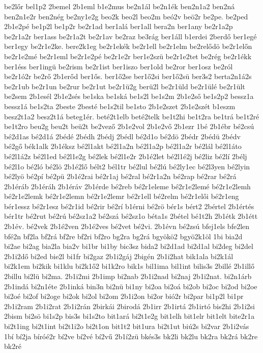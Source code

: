 {be2lőr
bel1p2
2bemel
2b1eml
b1e2mus
be2n1ál
be2n1ék
ben2n1a2
ben2ná
ben2n1e2r
ben2nég
be2ny1e2g
beo2k
beo2l
beo2m
beó2v
beö2r
be2pe.
be2ped
2b1e2pé
be1p2l
be1p2r
be2r1ad
ber1alá
ber1all
bera2n
ber1any
be2r1a2p
be2r1a2r
ber1ass
be2r1a2t
be2r1av
be2raz
be3rág
ber1áll
b1erdei
2berdő
ber1egé
ber1egy
be2r1e2ke.
bere2k1eg
be2r1ekék
be2r1ell
be2r1elm
be2relődö
be2r1előn
be2r1e2mé
be2r1eml
be2r1e2pé
be2r1e2r
ber1e2szü
be2r1e2tet
be2rég
be2r1ékk
ber1éss
ber1ingü
be2rism
be2r1ist
ber1iszo
ber1old
be2ror
ber1osz
be2ról
be2r1ó2r
be2rő
2b1erőd
ber1ős.
ber1ő2se
ber1ő2si
ber1ő2sü
ber3s2
berta2n1á2s
be2r1ub
be2r1un
be2rur
be2r1ut
be2r1ü2g
berü2l
be2r1üld
be2r1ülé
be2r1ült
be2sem
2b1esél
2b1e2sés
be1ska
be1ská
be1s2l
be1s2m
2b1e2ső
be1s2p2
bessz1a
bessz1á
be1s2ta
2beste
2besté
be1s2til
be1sto
2b1e2szet
2b1e2szét
b1eszm
besz2t1a2
besz2t1á
beteg1ér.
beté2t1elb
beté2telk
be1t2hi
be1t2ra
be1trá
be1t2ré
be1t2ro
beu2g
beu2t
beü2t
be2vező
2b1e2vol
2b1e2vő
2b1ezr
1bé
2b1ébr
bé2csú
bé2d1as
bé2d1á
2bédé
2bédh
2bédj
2bédl
bé2d1o
bé2dö
2bédr
2bédü
2bédv
bé2gő
bék1alk
2b1éksz
bé2l1akt
bé2l1a2n
bé2l1a2p
bé2l1a2r
bé2lál
bé2l1áto
bé2l1á2z
bé2l1ed
bé2l1e2g
bé2lek
bé2l1e2r
2b1é2let
bé2l1é2j
bé2liz
bé2lí
2bélj
bé2l1o
bé2ló
bé2lö
2b1é2lő
bélt2
bél1tr
bé2lul
bé2lú
bé2ly1ec
bé2l3yen
bé2lyin
bé2lyö
bé2pí
bé2pü
2b1é2rai
bé2r1aj
bé2ral
bé2r1a2n
bé2rap
bé2rar
bé2rá
2b1éráb
2b1éráh
2b1éráv
2b1érde
bé2reb
bé2r1eleme
bé2r1e2lemé
bé2r1e2lemh
bé2r1e2lemk
bé2r1e2lemn
bé2r1e2lemr
bé2r1ell
bé2relm
bé2r1elői
bé2r1eng
bér1essz
bé2r1esz
bé2r1id
bé2rir
bé2rí
b1érni
bé2rö
bér1s
bért2
2bértel
2b1értés
bér1tr
bé2rut
bé2rú
bé2sz1a2
bé2szá
bé2sz1o
béta1s
2bétel
bé1t2h
2b1étk
2b1étt
2b1év.
bé2vek
2b1é2ven
2b1é2ves
bé2vet
bé2vi.
2b1évn
bé2zsú
bfej1els
bfe2len
bfé2n
bf2la
bf2rá
bf2re
bf2ri
bf2ro
bg2ra
bg2rá
bgyökö2
bgyö2k1öl
1bi
bia2d
bi2ae
bi2ag
bia2la
bia2v
bi1br
bi1by
bic3sz
bida2
bi2d1ad
bi2d1al
bi2deg
bi2del
2b1i2dő
bi2ed
bie2l
bi1fr
bi2gaz
2b1i2gáj
2bigén
2b1i2hat
bik1ala
bi2k1ál
bi2k1em
bi2kik
bi1klu
bi2k1ő2
bi1k2ro
bik1s
bil1ima
bil1int
bilis3s
2billé
2b1illő
2billu
bi2lü
bi2ma.
2b1i2mi
2b1imp
bi2nab
2b1i2nad
bi2naj
2b1i2nat.
bi2n1árb
2b1indá
bi2n1éte
2b1inká
bin3n
bi2nü
bi1ny
bi2oa
bi2oá
bi2ob
bi2oc
bi2od
bi2oe
bi2oé
bi2of
bi2oge
bi2ok
bi2ol
bi2om
2b1i2on
bi2or
bió2r
bi2par
bi1p2l
bi1pr
2b1i2ram
2b1i2rat
2b1i2rán
2birkái
2birodá
2b1irr
2b1irtá
2b1irtó
bis2hi
2b1i2si
2bism
bi2sö
bi1s2p
bis3s
bi1s2to
bit1ará
bi2t1e2g
bit1elh
bit1elr
bit1elt
bite2r1a
bi2t1ing
bi2t1int
bi2t1i2o
bi2t1on
bit1t2
bit1ura
bi2t1ut
biú2s
bi2var
2b1i2vás
1bí
bí2ja
bíróé2r
bí2ve
bí2vé
bí2vű
2b1í2zü
bkés3s
bk2li
bk2lu
bk2ra
bk2rá
bk2re
bk2ré
}
